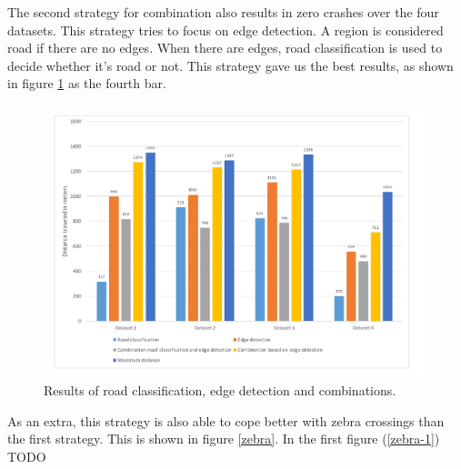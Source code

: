 \documentclass[runningheads,a4paper]{llncs}
\begin{document}
The second strategy for combination also results in zero crashes over the four datasets. This strategy tries to focus on edge detection. A region is considered road if there are no edges. When there are edges, road classification is used to decide whether it's road or not. This strategy gave us the best results, as shown in figure \ref{distance_result} as the fourth bar.
\begin{figure}[ht]
	\centering
	\includegraphics[width=\textwidth]{fig/distance_result}
	\caption{Results of road classification, edge detection and combinations.\label{distance_result}}
\end{figure}

As an extra, this strategy is also able to cope better with zebra crossings than the first strategy. This is shown in figure \ref{zebra}. In the first figure (\ref{zebra-1}) TODO
\end{document}
